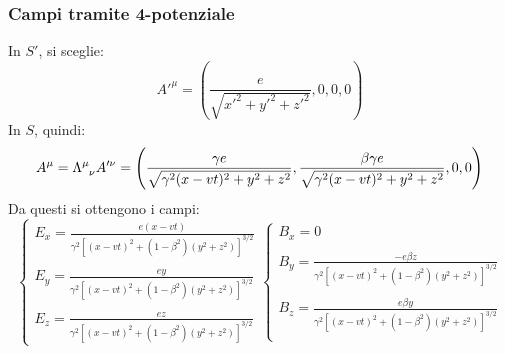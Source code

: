 \documentclass[10pt, a4paper]{scrartcl}
\numberwithin{equation}{subsection}
\theoremstyle{style1}
\begin{document}
\subsubsection{Campi tramite 4-potenziale}
In $S'$, si sceglie:
\begin{equation}
	A'^\mu  = \left(\frac{e}{\sqrt{x'^2 + y'^2 + z'^2} },0,0,0\right) 
\end{equation}
In $S$, quindi:
\begin{equation}
	A^\mu = \Lambda \indices{^{\mu }_{\nu }} A'^\nu = \left(\frac{\gamma e }{\sqrt{\gamma^2 (x-vt)^2 + y^2 + z^2} }, \frac{\beta  \gamma e}{\sqrt{\gamma^2 (x-vt)^2 + y^2 + z^2} },0,0\right) 
\end{equation}
Da questi si ottengono i campi:
\begin{equation*}
	\begin{cases}
		\displaystyle E_x = \frac{e (x-vt) }{\gamma^2 \left[ (x-vt)^2 + (1-\beta ^2) (y^2+z^2) \right] ^{3 / 2} }\\
		\\
		\displaystyle E_y = \frac{e y}{\gamma^2 \left[ (x-vt)^2 + (1-\beta ^2) (y^2+z^2) \right] ^{3 / 2} }\\
		\\
		\displaystyle E_z = \frac{e z}{\gamma^2 \left[ (x-vt)^2 + (1-\beta ^2) (y^2+z^2) \right] ^{3 / 2} }
	\end{cases}
	\begin{cases}
		B_x = 0\\
		\\
		\displaystyle B_y = \frac{-e \beta  z}{\gamma^2 \left[ (x-vt)^2 + (1-\beta ^2) (y^2+z^2) \right] ^{3 / 2} }\\
		\\
		\displaystyle B_z = \frac{e \beta  y}{\gamma^2 \left[ (x-vt)^2 + (1-\beta ^2) (y^2+z^2) \right] ^{3 / 2} }\\
	\end{cases}
\end{equation*}
\end{document}

